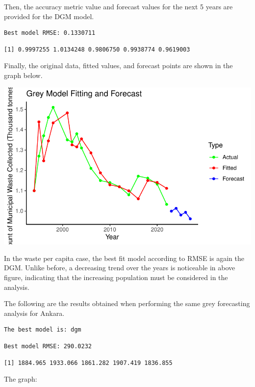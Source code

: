 \documentclass[
  11pt,
  a4paper,
  DIV=11,
  numbers=noendperiod]{scrartcl}
\begin{document}
Then, the accuracy metric value and forecast values for the next 5 years
are provided for the DGM model.

\begin{verbatim}
Best model RMSE: 0.1330711 
\end{verbatim}

\begin{verbatim}
[1] 0.9997255 1.0134248 0.9806750 0.9938774 0.9619003
\end{verbatim}

Finally, the original data, fitted values, and forecast points are shown
in the graph below.

\includegraphics{project_files/figure-pdf/unnamed-chunk-51-1.pdf}

In the waste per capita case, the best fit model according to RMSE is
again the DGM. Unlike before, a decreasing trend over the years is
noticeable in above figure, indicating that the increasing population
must be considered in the analysis.

The following are the results obtained when performing the same grey
forecasting analysis for Ankara.

\begin{verbatim}
The best model is: dgm 
\end{verbatim}

\begin{verbatim}
Best model RMSE: 290.0232 
\end{verbatim}

\begin{verbatim}
[1] 1884.965 1933.066 1861.282 1907.419 1836.855
\end{verbatim}

The graph:
\end{document}
